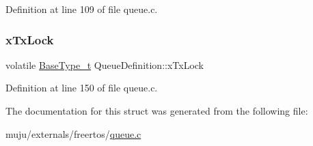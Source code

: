 Definition at line 109 of file queue.\+c.

\mbox{\label{struct_queue_definition_a96013417532d70900fb608f5926d8043}} 
\subsubsection{\texorpdfstring{x\+Tx\+Lock}{xTxLock}}
{\footnotesize\ttfamily volatile \hyperlink{externals_2freertos_2portable_2_g_c_c_2_a_r_m___c_m0_2portmacro_8h_a46fb21e00ae0729d7515c0fbf2269796}{Base\+Type\+\_\+t} Queue\+Definition\+::x\+Tx\+Lock}



Definition at line 150 of file queue.\+c.



The documentation for this struct was generated from the following file\+:\begin{DoxyCompactItemize}
\item 
muju/externals/freertos/\hyperlink{externals_2freertos_2queue_8c}{queue.\+c}\end{DoxyCompactItemize}
